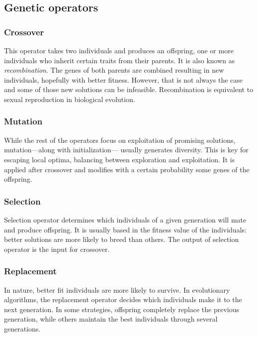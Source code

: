 \subsection{Genetic operators}
	\subsubsection{Crossover}
		This operator takes two individuals and produces an offspring, one or more individuals who inherit certain traits from their parents. It is also known as \textit{recombination}. The genes of both parents are combined resulting in new individuals, hopefully with better fitness. However, that is not always the case and some of those new solutions can be infeasible. Recombination is equivalent to sexual reproduction in biological evolution.  
	\subsubsection{Mutation}
		While the rest of the operators focus on exploitation of promising solutions, mutation---along with initialization--- usually generates diversity. This is key for escaping local optima, balancing between exploration and exploitation. It is applied after crossover and modifies with a certain probability some genes of the offspring.
	\subsubsection{Selection}
		Selection operator determines which individuals of a given generation will mate and produce offspring. It is usually based in the fitness value of the individuals: better solutions are more likely to breed than others. The output of selection operator is the input for crossover.
	\subsubsection{Replacement}
		In nature, better fit individuals are more likely to survive. In evolutionary algorithms, the replacement operator decides which individuals make it to the next generation. In some strategies, offspring completely replace the previous generation, while others maintain the best individuals through several generations. 
